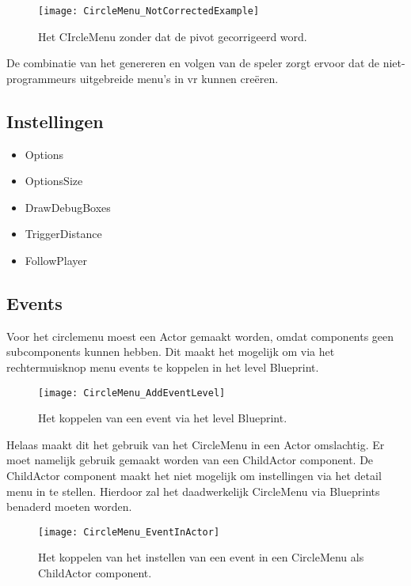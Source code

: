 \begin{figure}[!ht]
  \centering
    \texttt{[image: CircleMenu\_NotCorrectedExample]}
    \caption{Het CIrcleMenu zonder dat de pivot gecorrigeerd word.}
\end{figure}

De combinatie van het genereren en volgen van de speler zorgt ervoor dat de niet-programmeurs uitgebreide menu's in \gls{vr} kunnen creëren.

\subsection{Instellingen}
\begin{itemize}
	\item Options
	\item OptionsSize
	\item DrawDebugBoxes
	\item TriggerDistance
	\item FollowPlayer
\end{itemize}

\subsection{Events}
Voor het circlemenu moest een Actor gemaakt worden, omdat components geen subcomponents kunnen hebben. Dit maakt het mogelijk om via het rechtermuisknop menu events te koppelen in het level Blueprint.

\begin{figure}[!ht]
  \centering
    \texttt{[image: CircleMenu\_AddEventLevel]}
    \caption{Het koppelen van een event via het level Blueprint.}
\end{figure}

Helaas maakt dit het gebruik van het CircleMenu in een Actor omslachtig. Er moet namelijk gebruik gemaakt worden van een ChildActor component. De ChildActor component maakt het niet mogelijk om instellingen via het detail menu in te stellen. Hierdoor zal het daadwerkelijk CircleMenu via Blueprints benaderd moeten worden.

\begin{figure}[H]
  \centering
    \texttt{[image: CircleMenu\_EventInActor]}
    \caption{Het koppelen van het instellen van een event in een CircleMenu als ChildActor component.}
\end{figure}

